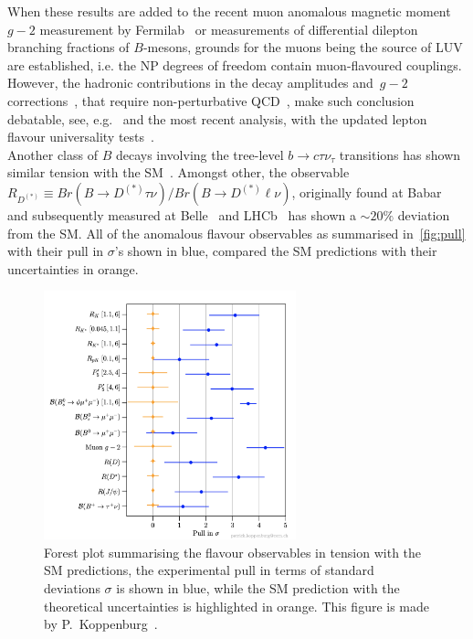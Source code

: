 When these results are added to the recent muon anomalous magnetic moment $g-2$ measurement by Fermilab~\cite{Muong-2:2021ojo} or measurements of differential dilepton branching fractions of $B$-mesons,  grounds for the muons being the source of LUV are established, i.e. the NP degrees of freedom contain muon-flavoured couplings.  However, the hadronic contributions  in the decay amplitudes and~$g-2$ corrections~\cite{Khodjamirian:2010vf,Lyon:2014hpa,Chobanova:2017ghn,Blake:2017fyh,Bobeth:2017vxj}, that require non-perturbative QCD~\cite{Jager:2014rwa,Ciuchini:2015qxb,Arbey:2018ics,Chrzaszcz:2018yza}, make such conclusion debatable, see, e.g.~\cite{Ciuchini:2018anp,Hurth:2020rzx} and the most recent analysis, with the updated lepton flavour universality tests~\cite{Ciuchini:2021smi}. \\
Another class of $B$ decays involving the tree-level $ b \to c \tau \nu_\tau$ transitions has shown similar tension with the SM~\cite{Azatov:2018knx,Alok:2019uqc,Murgui:2019czp,Shi:2019gxi}. Amongst other, the observable $R_{D^{(*)}} \equiv Br(B \to D^{(*)} \tau \nu) / Br(B \to D^{(*)} \ell \nu)$, originally found at Babar~\cite{Lees:2013uzd} and subsequently measured at Belle~\cite{Huschle:2015rga} and LHCb~\cite{Aaij:2017uff} has shown a $\sim 20\%$ deviation from the SM. All of the anomalous flavour observables as summarised in~\autoref{fig:pull} with their pull in $\sigma$'s shown in blue, compared the SM predictions with their uncertainties in orange. \\
\begin{figure}[ht!]
	\centering
	\includegraphics[width=0.65\textwidth]{fig/pull}
	\caption{ Forest plot summarising the flavour observables in tension with the SM predictions, the experimental pull in terms of standard deviations $\sigma$ is shown in blue, while the SM prediction with the theoretical uncertainties is highlighted in orange. This figure is made by P.~Koppenburg~\cite{Koppenburg:2767155}. }
	\label{fig:pull}
\end{figure}
